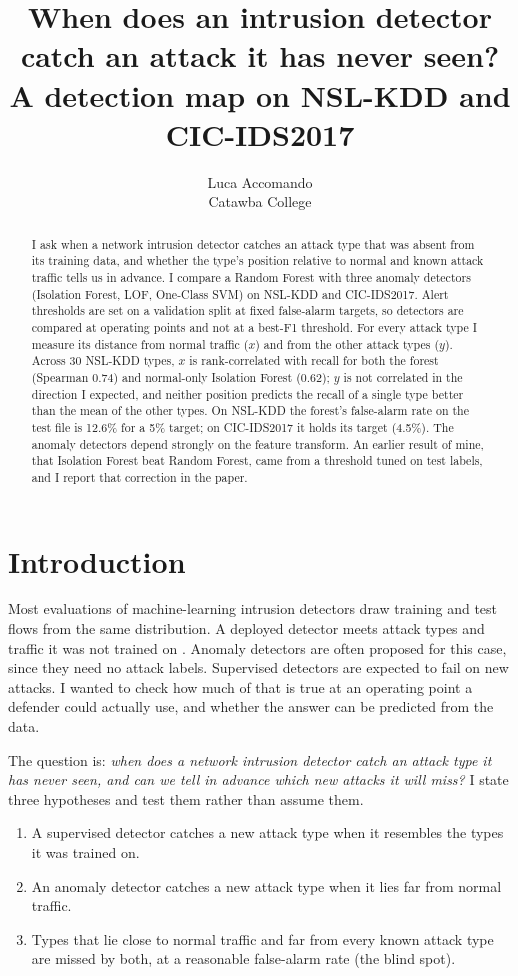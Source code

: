 \documentclass[10pt]{article}
\title{When does an intrusion detector catch an attack it has never seen?\\
A detection map on NSL-KDD and CIC-IDS2017}
\author{Luca Accomando\\Catawba College}
\date{}
\begin{document}
\maketitle

\begin{abstract}
I ask when a network intrusion detector catches an attack type that was absent from its training data, and
whether the type's position relative to normal and known attack traffic tells us in advance. I compare a
Random Forest with three anomaly detectors (Isolation Forest, LOF, One-Class SVM) on NSL-KDD and CIC-IDS2017.
Alert thresholds are set on a validation split at fixed false-alarm targets, so detectors are compared at
operating points and not at a best-F1 threshold. For every attack type I measure its distance from normal
traffic ($x$) and from the other attack types ($y$). Across 30 NSL-KDD types, $x$ is rank-correlated with
recall for both the forest (Spearman 0.74) and normal-only Isolation Forest (0.62); $y$ is not
correlated in the direction I expected, and neither position predicts the recall of a single type
better than the mean of the other types. On NSL-KDD the forest's false-alarm rate on the test file is 12.6\% for a
5\% target; on CIC-IDS2017 it holds its target (4.5\%). The anomaly detectors depend strongly on the feature
transform. An earlier result of mine, that Isolation Forest beat Random Forest, came from a threshold tuned on
test labels, and I report that correction in the paper.
\end{abstract}

\section{Introduction}

Most evaluations of machine-learning intrusion detectors draw training and test flows from the same
distribution. A deployed detector meets attack types and traffic it was not trained on
\cite{sommer2010,arp2022}. Anomaly detectors are often proposed for this case, since they need no attack
labels. Supervised detectors are expected to fail on new attacks. I wanted to check how much of that is true
at an operating point a defender could actually use, and whether the answer can be predicted from the data.

The question is: \emph{when does a network intrusion detector catch an attack type it has never seen, and can we
tell in advance which new attacks it will miss?} I state three hypotheses and test them rather than assume
them.
\begin{enumerate}
\item A supervised detector catches a new attack type when it resembles the types it was trained on.
\item An anomaly detector catches a new attack type when it lies far from normal traffic.
\item Types that lie close to normal traffic and far from every known attack type are missed by both, at a
reasonable false-alarm rate (the blind spot).
\end{enumerate}
\end{document}
